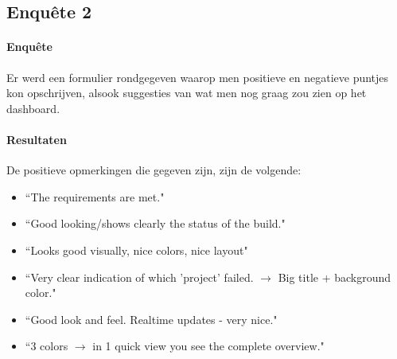 \documentclass[10pt,a4paper]{article}
\begin{document}
\begin{appendices}
\section{Enqu\^ete 2}
\label{enquete2}
\paragraph{Enqu\^ete}
Er werd een formulier rondgegeven waarop men positieve en negatieve puntjes kon opschrijven, alsook suggesties van wat men nog graag zou zien op het dashboard.

\paragraph{Resultaten}
De positieve opmerkingen die gegeven zijn, zijn de volgende:
\begin{itemize}
\item ``The requirements are met."
\item ``Good looking/shows clearly the status of the build."
\item ``Looks good visually, nice colors, nice layout"
\item ``Very clear indication of which 'project' failed. $\rightarrow$ Big title + background color."
\item ``Good look and feel. Realtime updates - very nice."
\item ``3 colors $\rightarrow$ in 1 quick view you see the complete overview."
\end{itemize}


\end{appendices}
\end{document}
